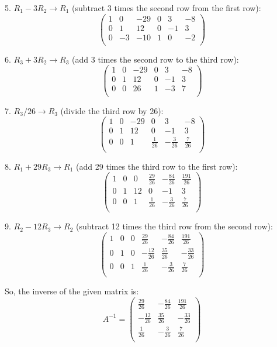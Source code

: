 5. $R_1 - 3R_2 \rightarrow R_1$ (subtract 3 times the second row from the first row):
\[
\left(\begin{array}{ccc|ccc}
    1 & 0 & -29 & 0 & 3 & -8\\
    0 & 1 & 12 & 0 & -1 & 3\\
    0 & -3 & -10 & 1 & 0 & -2\\
\end{array}\right)
\]

6. $R_3 + 3R_2 \rightarrow R_3$ (add 3 times the second row to the third row):
\[
\left(\begin{array}{ccc|ccc}
    1 & 0 & -29 & 0 & 3 & -8\\
    0 & 1 & 12 & 0 & -1 & 3\\
    0 & 0 & 26 & 1 & -3 & 7\\
\end{array}\right)
\]

7. $R_3/26 \rightarrow R_3$ (divide the third row by 26):
\[
\left(\begin{array}{ccc|ccc}
    1 & 0 & -29 & 0 & 3 & -8\\
    0 & 1 & 12 & 0 & -1 & 3\\
    0 & 0 & 1 & \frac{1}{26} & -\frac{3}{26} & \frac{7}{26}\\
\end{array}\right)
\]

8. $R_1 + 29R_3 \rightarrow R_1$ (add 29 times the third row to the first row):
\[
\left(\begin{array}{ccc|ccc}
    1 & 0 & 0 & \frac{29}{26} & -\frac{84}{26} & \frac{191}{26}\\
    0 & 1 & 12 & 0 & -1 & 3\\
    0 & 0 & 1 & \frac{1}{26} & -\frac{3}{26} & \frac{7}{26}\\
\end{array}\right)
\]

9. $R_2 - 12R_3 \rightarrow R_2$ (subtract 12 times the third row from the second row):
\[
\left(\begin{array}{ccc|ccc}
    1 & 0 & 0 & \frac{29}{26} & -\frac{84}{26} & \frac{191}{26}\\
    0 & 1 & 0 & -\frac{12}{26} & \frac{35}{26} & -\frac{33}{26}\\
    0 & 0 & 1 & \frac{1}{26} & -\frac{3}{26} & \frac{7}{26}\\
\end{array}\right)
\]

So, the inverse of the given matrix is:
\[
\boxed{
    A^{-1} = \begin{pmatrix}
        \frac{29}{26} & -\frac{84}{26} & \frac{191}{26}\\
        -\frac{12}{26} & \frac{35}{26} & -\frac{33}{26}\\
        \frac{1}{26} & -\frac{3}{26} & \frac{7}{26}\\
    \end{pmatrix}
}
\]








